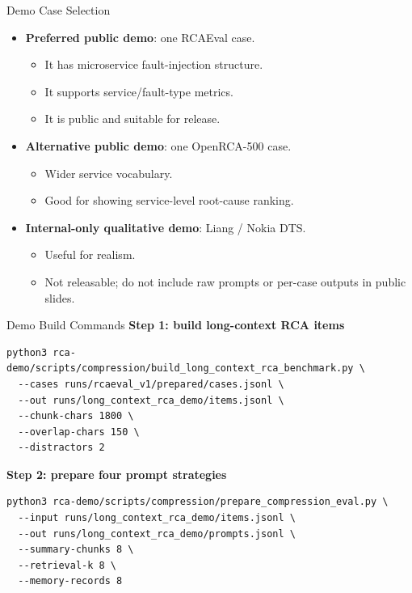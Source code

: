 \begin{frame}{Demo Case Selection}
  \begin{itemize}
    \item \textbf{Preferred public demo}: one RCAEval case.
      \begin{itemize}
        \item It has microservice fault-injection structure.
        \item It supports service/fault-type metrics.
        \item It is public and suitable for release.
      \end{itemize}
    \item \textbf{Alternative public demo}: one OpenRCA-500 case.
      \begin{itemize}
        \item Wider service vocabulary.
        \item Good for showing service-level root-cause ranking.
      \end{itemize}
    \item \textbf{Internal-only qualitative demo}: Liang / Nokia DTS.
      \begin{itemize}
        \item Useful for realism.
        \item Not releasable; do not include raw prompts or per-case outputs in public slides.
      \end{itemize}
  \end{itemize}
\end{frame}

\begin{frame}[fragile]{Demo Build Commands}
  \small
  \textbf{Step 1: build long-context RCA items}
  \begin{verbatim}
python3 rca-demo/scripts/compression/build_long_context_rca_benchmark.py \
  --cases runs/rcaeval_v1/prepared/cases.jsonl \
  --out runs/long_context_rca_demo/items.jsonl \
  --chunk-chars 1800 \
  --overlap-chars 150 \
  --distractors 2
  \end{verbatim}

  \textbf{Step 2: prepare four prompt strategies}
  \begin{verbatim}
python3 rca-demo/scripts/compression/prepare_compression_eval.py \
  --input runs/long_context_rca_demo/items.jsonl \
  --out runs/long_context_rca_demo/prompts.jsonl \
  --summary-chunks 8 \
  --retrieval-k 8 \
  --memory-records 8
  \end{verbatim}
\end{frame}

